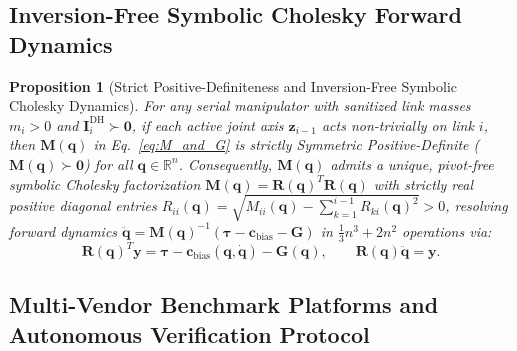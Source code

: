 \documentclass[fleqn,10pt]{article}
\newtheorem{proposition}{Proposition}
\begin{document}
	\subsection*{Inversion-Free Symbolic Cholesky Forward Dynamics}
	
	\begin{proposition}[Strict Positive-Definiteness and Inversion-Free Symbolic Cholesky Dynamics]
		\label{prop:cholesky}
		For any serial manipulator with sanitized link masses $m_i > 0$ and $\bm{I}_i^{\text{DH}} \succ \bm{0}$, if each active joint axis $\bm{z}_{i-1}$ acts non-trivially on link $i$, then $\bm{M}(\bm{q})$ in Eq.~\eqref{eq:M_and_G} is strictly Symmetric Positive-Definite ($\bm{M}(\bm{q}) \succ \bm{0}$) for all $\bm{q} \in \mathbb{R}^n$. Consequently, $\bm{M}(\bm{q})$ admits a unique, pivot-free symbolic Cholesky factorization $\bm{M}(\bm{q}) = \bm{R}(\bm{q})^T\bm{R}(\bm{q})$ with strictly real positive diagonal entries $R_{ii}(\bm{q}) = \sqrt{M_{ii}(\bm{q}) - \sum_{k=1}^{i-1} R_{ki}(\bm{q})^2} > 0$, resolving forward dynamics $\ddot{\bm{q}} = \bm{M}(\bm{q})^{-1}(\bm{\tau} - \mathbf{c}_{\text{bias}} - \bm{G})$ in $\frac{1}{3}n^3 + 2n^2$ operations via:
		\begin{equation}
			\bm{R}(\bm{q})^T \bm{y} = \bm{\tau} - \mathbf{c}_{\text{bias}}(\bm{q},\dot{\bm{q}}) - \bm{G}(\bm{q}), \qquad \bm{R}(\bm{q})\ddot{\bm{q}} = \bm{y}.
			\label{eq:cholesky_solve}
		\end{equation}
	\end{proposition}
	
	\subsection*{Multi-Vendor Benchmark Platforms and Autonomous Verification Protocol}
	
\end{document}
